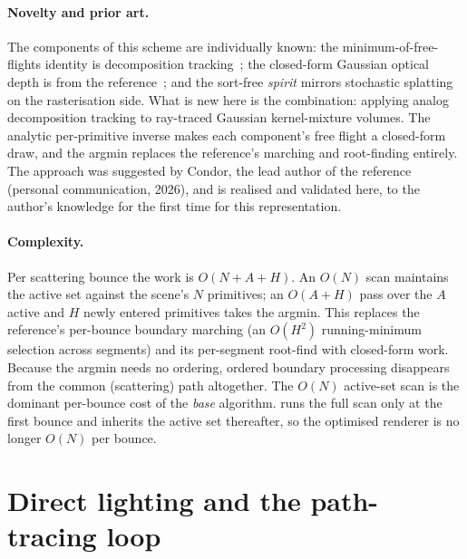\paragraph{Novelty and prior art.} The components of this scheme are individually known: the
minimum-of-free-flights identity is decomposition tracking~\cite{Kutz2017}; the closed-form Gaussian
optical depth is from the reference~\cite{DSYG}; and the sort-free \emph{spirit} mirrors stochastic
splatting~\cite{StochasticSplats2025} on the rasterisation side. What is new here is the
combination: applying analog decomposition tracking to ray-traced Gaussian kernel-mixture volumes.
The analytic per-primitive inverse makes each component's free flight a closed-form draw, and
the argmin replaces the reference's marching and root-finding entirely. The approach was suggested by
Condor, the lead author of the reference~\cite{DSYG} (personal communication, 2026), and is realised and
validated here, to the author's knowledge for the first time for this representation.

\paragraph{Complexity.} Per scattering bounce the work is $O(N + A + H)$. An $O(N)$ scan maintains the
active set against the scene's $N$ primitives; an $O(A + H)$ pass over the $A$ active and $H$
newly entered primitives takes the argmin. This replaces the reference's per-bounce boundary
marching (an $O(H^2)$ running-minimum selection across segments) and its per-segment root-find with
closed-form work. Because the argmin needs no ordering, ordered boundary processing disappears
from the common (scattering) path altogether. The $O(N)$ active-set
scan is the dominant per-bounce cost of the \emph{base} algorithm.  runs the full
scan only at the first bounce and inherits the active set thereafter, so the optimised renderer is no
longer $O(N)$ per bounce.

\section{Direct lighting and the path-tracing loop}
\label{sec:direct-lighting}

